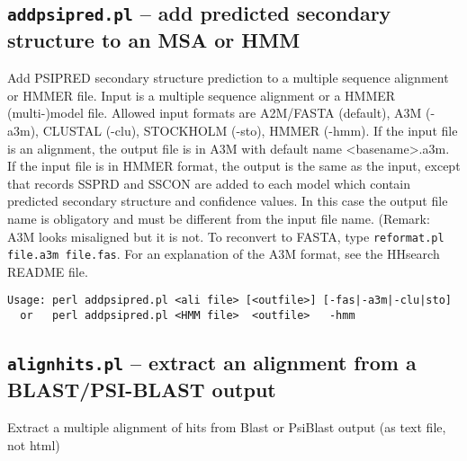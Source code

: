 \documentclass[11pt,a4paper]{article}
\begin{document}
\subsection{{\tt addpsipred.pl} -- add predicted secondary structure to an MSA or HMM}
Add PSIPRED secondary structure prediction to a multiple sequence alignment or HMMER file.
Input is a  multiple sequence alignment or a HMMER (multi-)model file. Allowed input formats are 
A2M/FASTA (default), A3M (-a3m), CLUSTAL (-clu), STOCKHOLM (-sto), HMMER (-hmm).
If the input file is an alignment, the output file is in A3M with default name <basename>.a3m.
If the input file is in HMMER format, the output is the same as the input, except that records SSPRD 
and SSCON are added to each model which contain predicted secondary structure and confidence values. 
In this case the output file name is obligatory and must be different from the input file name.
(Remark: A3M looks misaligned but it is not. To reconvert to FASTA, type  
\verb`reformat.pl file.a3m file.fas`. For an explanation of the A3M format, see the HHsearch 
README file.     

\small \begin{verbatim}
Usage: perl addpsipred.pl <ali file> [<outfile>] [-fas|-a3m|-clu|sto]  
  or   perl addpsipred.pl <HMM file>  <outfile>   -hmm  
\end{verbatim} \normalsize


\subsection{{\tt alignhits.pl} -- extract an alignment from a BLAST/PSI-BLAST output}

Extract a multiple alignment of hits from Blast or PsiBlast output (as text file, not html)
\end{document}
